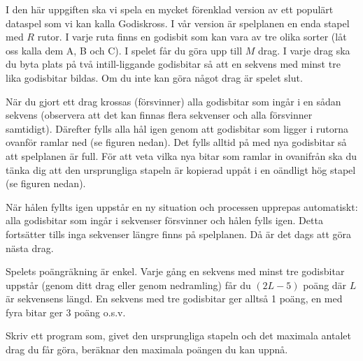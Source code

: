 
I den här uppgiften ska vi spela en mycket förenklad version av ett populärt dataspel som vi kan kalla Godiskross. I vår version är spelplanen en enda stapel med $R$ rutor. I varje ruta finns en godisbit som kan vara av tre olika sorter (låt oss kalla dem A, B och C). I spelet får du göra upp till $M$ drag. I varje drag ska du byta plats på två intill-liggande godisbitar så att en sekvens med minst tre lika godisbitar bildas. Om du inte kan göra något drag är spelet slut.

När du gjort ett drag krossas (försvinner) alla godisbitar som ingår i en sådan sekvens (observera att det kan finnas flera sekvenser och alla försvinner samtidigt). Därefter fylls alla hål igen genom att godisbitar som ligger i rutorna ovanför ramlar ned (se figuren nedan). Det fylls alltid på med nya godisbitar så att spelplanen är full. För att veta vilka nya bitar som ramlar in ovanifrån ska du tänka dig att den ursprungliga stapeln är kopierad uppåt i en oändligt hög stapel (se figuren nedan).

När hålen fyllts igen uppstår en ny situation och processen upprepas automatiskt: alla godisbitar som ingår i sekvenser försvinner och hålen fylls igen. Detta fortsätter tills inga sekvenser längre finns på spelplanen. Då är det dags att göra nästa drag.

Spelets poängräkning är enkel. Varje gång en sekvens med minst tre godisbitar uppstår (genom ditt drag eller genom nedramling) får du $(2L-5)$ poäng där $L$ är sekvensens längd. En sekvens med tre godisbitar ger alltså 1 poäng, en med fyra bitar ger 3 poäng o.s.v.

Skriv ett program som, givet den ursprungliga stapeln och det maximala antalet drag du får göra, beräknar den maximala poängen du kan uppnå.


